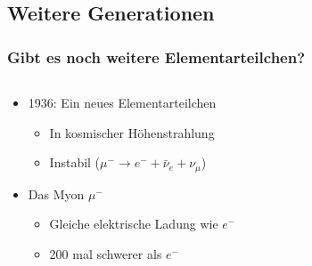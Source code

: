 \documentclass{beamer}
\begin{document}
\subsection{Weitere Generationen}
\begin{frame}
  \frametitle{Gibt es noch weitere Elementarteilchen?}
  \begin{columns}
    \begin{column}{0.6\textwidth}
      \begin{itemize}
      \item 1936: Ein neues Elementarteilchen
        \begin{itemize}
        \item In kosmischer H\"ohenstrahlung
        \item Instabil ($\mu^{-}\rightarrow e^{-} + \bar{\nu}_{e} + \nu_{\mu}$)
        \end{itemize}
      \item Das Myon $\mu^{-}$
        \begin{itemize}
        \item Gleiche elektrische Ladung wie $e^{-}$
        \item 200 mal schwerer als $e^{-}$
        \end{itemize}
      \end{itemize}
\end{column}
\end{columns}
\end{frame}
\end{document}
